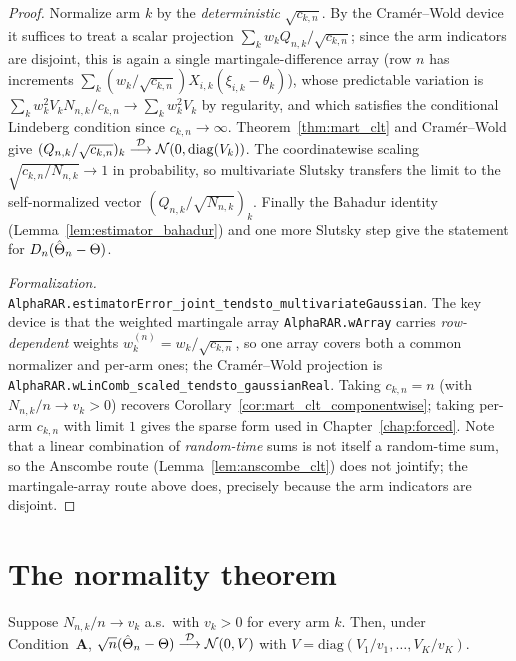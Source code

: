 \begin{proof}\leanok
{}
Normalize arm $k$ by the \emph{deterministic} $\sqrt{c_{k,n}}$. By the Cramér--Wold device it
suffices to treat a scalar projection $\sum_k w_k Q_{n,k}/\sqrt{c_{k,n}}$; since the arm indicators
are disjoint, this is again a single martingale-difference array (row $n$ has increments
$\sum_k (w_k/\sqrt{c_{k,n}})X_{i,k}(\xi_{i,k}-\theta_k)$), whose predictable variation is
$\sum_k w_k^2 V_k N_{n,k}/c_{k,n}\to\sum_k w_k^2V_k$ by regularity, and which satisfies the
conditional Lindeberg condition since $c_{k,n}\to\infty$. Theorem~\ref{thm:mart_clt} and
Cramér--Wold give $(Q_{n,k}/\sqrt{c_{k,n}})_k\overset{\mathcal{D}}{\longrightarrow}\mathcal N(0,\mathrm{diag}(V_k))$. The
coordinatewise scaling $\sqrt{c_{k,n}/N_{n,k}}\to1$ in probability, so multivariate Slutsky
transfers the limit to the self-normalized vector $(Q_{n,k}/\sqrt{N_{n,k}})_k$. Finally the Bahadur
identity (Lemma~\ref{lem:estimator_bahadur}) and one more Slutsky step give the statement for
$D_n(\hat{\Theta}_n-\Theta)$.

\emph{Formalization.} \texttt{AlphaRAR.estimatorError\_joint\_tendsto\_multivariateGaussian}. The key
device is that the weighted martingale array \texttt{AlphaRAR.wArray} carries \emph{row-dependent}
weights $w^{(n)}_k = w_k/\sqrt{c_{k,n}}$, so one array covers both a common normalizer and per-arm
ones; the Cramér--Wold projection is
\texttt{AlphaRAR.wLinComb\_scaled\_tendsto\_gaussianReal}. Taking $c_{k,n}=n$ (with
$N_{n,k}/n\to v_k>0$) recovers Corollary~\ref{cor:mart_clt_componentwise}; taking per-arm $c_{k,n}$
with limit $1$ gives the sparse form used in Chapter~\ref{chap:forced}. Note that a linear
combination of \emph{random-time} sums is not itself a random-time sum, so the Anscombe route
(Lemma~\ref{lem:anscombe_clt}) does not jointify; the martingale-array route above does, precisely
because the arm indicators are disjoint.
\end{proof}

\section{The normality theorem}
\label{sec:norm_main}

\begin{lemma}\label{lem:clt_theta}
\leanok
{}
Suppose $N_{n,k}/n\to v_k$ a.s.\ with $v_k>0$ for every arm $k$. Then, under
Condition~\textbf{A}, $\sqrt n(\hat{\Theta}_n - \Theta)\overset{\mathcal{D}}{\longrightarrow}\mathcal{N}(0,V)$ with
$V=\mathrm{diag}(V_1/v_1,\dots,V_K/v_K)$.
\end{lemma}

